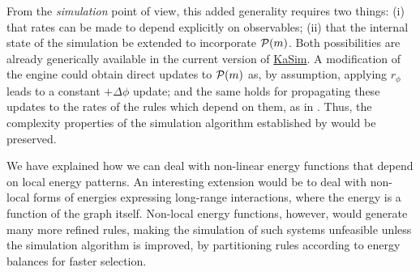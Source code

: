 From the \emph{simulation} point of view,
this added generality requires two things:
(i) that rates can be made to depend explicitly on observables;
(ii) that the internal state of the simulation
be extended to incorporate $\mathcal{P}(m)$.
Both possibilities are already generically available in
the current version of
\href{https://github.com/Kappa-Dev/KaSim}{KaSim}.
A modification of the engine could obtain
direct updates to $\mathcal{P}(m)$ as, by assumption,
applying $r_\phi$ leads to a constant $+\Delta\phi$ update;
and the same holds for propagating these updates
to the rates of the rules which depend on them,
\eg as in .
Thus, the complexity properties of the simulation algorithm
established by \citet{scalable} would be preserved.

We have explained how we can deal with non-linear energy functions
that depend on local energy patterns.
An interesting extension would be to deal with
non-local forms of energies expressing
long-range interactions,
where the energy is a function of the graph itself.
Non-local energy functions, however,
would generate many more refined rules,
making the simulation of such systems unfeasible
unless the simulation algorithm is improved,
\eg by partitioning rules according to energy balances
for faster selection.





